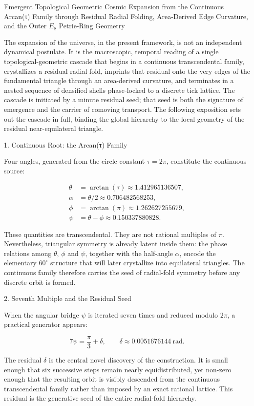 Emergent Topological Geometric Cosmic Expansion  
from the Continuous Arcan(τ) Family through Residual Radial Folding, Area-Derived Edge Curvature, and the Outer \(E_8\) Petrie-Ring Geometry

The expansion of the universe, in the present framework, is not an independent dynamical postulate. It is the macroscopic, temporal reading of a single topological-geometric cascade that begins in a continuous transcendental family, crystallizes a residual radial fold, imprints that residual onto the very edges of the fundamental triangle through an area-derived curvature, and terminates in a nested sequence of densified shells phase-locked to a discrete tick lattice. The cascade is initiated by a minute residual seed; that seed is both the signature of emergence and the carrier of comoving transport. The following exposition sets out the cascade in full, binding the global hierarchy to the local geometry of the residual near-equilateral triangle.

1. Continuous Root: the Arcan(τ) Family

Four angles, generated from the circle constant \(\tau=2\pi\), constitute the continuous source:

\[
\begin{align*}
\theta &= \arctan(\tau) \approx 1.412965136507,\\
\alpha &= \theta/2 \approx 0.706482568253,\\
\phi &= \arctan(\pi) \approx 1.262627255679,\\
\psi &= \theta-\phi \approx 0.150337880828.
\end{align*}
\]

These quantities are transcendental. They are not rational multiples of \(\pi\). Nevertheless, triangular symmetry is already latent inside them: the phase relations among \(\theta\), \(\phi\) and \(\psi\), together with the half-angle \(\alpha\), encode the elementary \(60^\circ\) structure that will later crystallize into equilateral triangles. The continuous family therefore carries the seed of radial-fold symmetry before any discrete orbit is formed.

2. Seventh Multiple and the Residual Seed

When the angular bridge \(\psi\) is iterated seven times and reduced modulo \(2\pi\), a practical generator appears:

\[
7\psi = \frac{\pi}{3}+\delta, \qquad \delta\approx 0.0051676144\ \text{rad}.
\]

The residual \(\delta\) is the central novel discovery of the construction. It is small enough that six successive steps remain nearly equidistributed, yet non-zero enough that the resulting orbit is visibly descended from the continuous transcendental family rather than imposed by an exact rational lattice. This residual is the generative seed of the entire radial-fold hierarchy.

